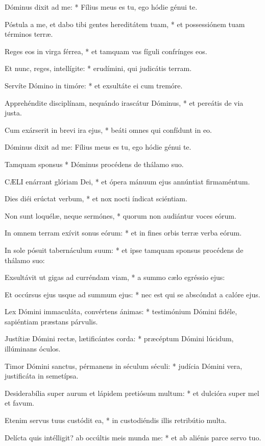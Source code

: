 Dóminus dixit ad me: * Fílius meus es tu, ego hódie génui te.

Póstula a me, et dabo tibi gentes hereditátem tuam, * et possessiónem tuam términos terræ.

Reges eos in virga férrea, * et tamquam vas fíguli confrínges eos.

Et nunc, reges, intellígite: * erudímini, qui judicátis terram.

Servíte Dómino in timóre: * et exsultáte ei cum tremóre.

Apprehéndite disciplínam, nequándo irascátur Dóminus, * et pereátis de via justa.

Cum exárserit in brevi ira ejus, * beáti omnes qui confídunt in eo.

 Dóminus dixit ad me: Fílius meus es tu, ego hódie génui te.

 Tamquam sponsus * Dóminus procédens de thálamo suo.


\lettrine[lines=2]{C}{ÆLI} enárrant glóriam Dei, * et ópera mánuum ejus annúntiat firmaméntum.

Dies diéi erúctat verbum, * et nox nocti índicat sciéntiam.

Non sunt loquélæ, neque sermónes, * quorum non audiántur voces eórum.

In omnem terram exívit sonus eórum: * et in fines orbis terræ verba eórum.

In sole pósuit tabernáculum suum: * et ipse tamquam sponsus procédens de thálamo suo:

Exsultávit ut gigas ad curréndam viam, * a summo cælo egréssio ejus:

Et occúrsus ejus usque ad summum ejus: * nec est qui se abscóndat a calóre ejus.

Lex Dómini immaculáta, convértens ánimas: * testimónium Dómini fidéle, sapiéntiam præstans párvulis.

Justítiæ Dómini rectæ, lætificántes corda: * præcéptum Dómini lúcidum, illúminans óculos.

Timor Dómini sanctus, pérmanens in séculum séculi: * judícia Dómini vera, justificáta in semetípsa.

Desiderabília super aurum et lápidem pretiósum multum: * et dulcióra super mel et favum.

Etenim servus tuus custódit ea, * in custodiéndis illis retribútio multa.

Delícta quis intélligit? ab occúltis meis munda me: * et ab aliénis parce servo tuo.


